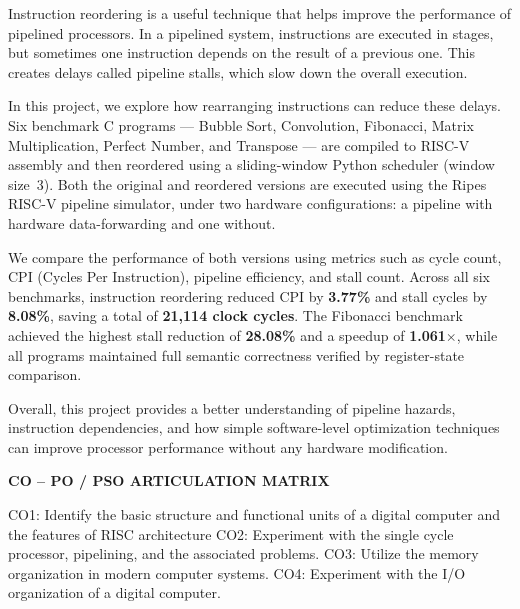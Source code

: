 \documentclass[11pt]{report}
\begin{document}
Instruction reordering is a useful technique that helps improve the performance of pipelined processors. In a pipelined system, instructions are executed in stages, but sometimes one instruction depends on the result of a previous one. This creates delays called pipeline stalls, which slow down the overall execution.

In this project, we explore how rearranging instructions can reduce these delays. Six benchmark C programs --- Bubble Sort, Convolution, Fibonacci, Matrix Multiplication, Perfect Number, and Transpose --- are compiled to RISC-V assembly and then reordered using a sliding-window Python scheduler (window size~3). Both the original and reordered versions are executed using the Ripes RISC-V pipeline simulator, under two hardware configurations: a pipeline with hardware data-forwarding and one without.

We compare the performance of both versions using metrics such as cycle count, CPI (Cycles Per Instruction), pipeline efficiency, and stall count. Across all six benchmarks, instruction reordering reduced CPI by \textbf{3.77\%} and stall cycles by \textbf{8.08\%}, saving a total of \textbf{21,114 clock cycles}. The Fibonacci benchmark achieved the highest stall reduction of \textbf{28.08\%} and a speedup of \textbf{1.061$\times$}, while all programs maintained full semantic correctness verified by register-state comparison.

Overall, this project provides a better understanding of pipeline hazards, instruction dependencies, and how simple software-level optimization techniques can improve processor performance without any hardware modification.


\newpage
{}
\setcounter{page}{3}
\thispagestyle{plain}
\begin{center}
\textbf{\large CO -- PO / PSO ARTICULATION MATRIX }
\end{center}

\vspace{0.5cm}
\noindent
CO1: Identify the basic structure and functional units of a digital computer and the features of RISC architecture
\newline
\noindent
CO2: Experiment with the single cycle processor, pipelining, and the associated problems.
\newline
\noindent
CO3: Utilize the memory organization in modern computer systems.
\newline
\noindent
CO4: Experiment with the I/O organization of a digital computer.
\vspace{0.5cm}
\end{document}
